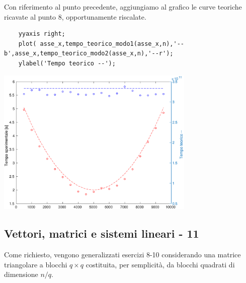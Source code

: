 \documentclass{article}
\begin{document}
Con riferimento al punto precedente, aggiungiamo al grafico le curve teoriche ricavate al punto 8, opportunamente riscalate.

\begin{lstlisting}
	yyaxis right;
	plot( asse_x,tempo_teorico_modo1(asse_x,n),'--b',asse_x,tempo_teorico_modo2(asse_x,n),'--r');
	ylabel('Tempo teorico --');
\end{lstlisting}
\begin{center}
\includegraphics[width=0.71\textwidth]{./Esercizi_images/untitled5.eps}
\end{center}

\clearpage
\subsection*{Vettori, matrici e sistemi lineari - 11}
Come richiesto, vengono generalizzati esercizi 8-10 considerando una matrice triangolare a blocchi $q \times q$ costituita, per semplicità, da blocchi quadrati di dimensione $n/q$.
\end{document}
